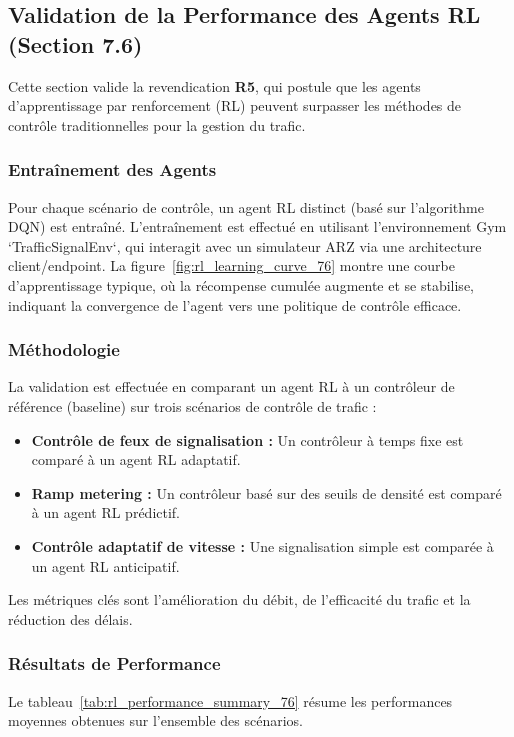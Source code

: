 \subsection{Validation de la Performance des Agents RL (Section 7.6)}
\label{subsec:validation_rl_performance}

Cette section valide la revendication \textbf{R5}, qui postule que les agents d'apprentissage par renforcement (RL) peuvent surpasser les méthodes de contrôle traditionnelles pour la gestion du trafic.

\subsubsection{Entraînement des Agents}
Pour chaque scénario de contrôle, un agent RL distinct (basé sur l'algorithme DQN) est entraîné. L'entraînement est effectué en utilisant l'environnement Gym `TrafficSignalEnv`, qui interagit avec un simulateur ARZ via une architecture client/endpoint. La figure~\ref{fig:rl_learning_curve_76} montre une courbe d'apprentissage typique, où la récompense cumulée augmente et se stabilise, indiquant la convergence de l'agent vers une politique de contrôle efficace.

\subsubsection{Méthodologie}
La validation est effectuée en comparant un agent RL à un contrôleur de référence (baseline) sur trois scénarios de contrôle de trafic :
\begin{itemize}
    \item \textbf{Contrôle de feux de signalisation :} Un contrôleur à temps fixe est comparé à un agent RL adaptatif.
    \item \textbf{Ramp metering :} Un contrôleur basé sur des seuils de densité est comparé à un agent RL prédictif.
    \item \textbf{Contrôle adaptatif de vitesse :} Une signalisation simple est comparée à un agent RL anticipatif.
\end{itemize}
Les métriques clés sont l'amélioration du débit, de l'efficacité du trafic et la réduction des délais.

\subsubsection{Résultats de Performance}

Le tableau~\ref{tab:rl_performance_summary_76} résume les performances moyennes obtenues sur l'ensemble des scénarios.

